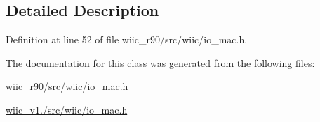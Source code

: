 \subsection{Detailed Description}


Definition at line 52 of file wiic\-\_\-r90/src/wiic/io\-\_\-mac.\-h.



The documentation for this class was generated from the following files\-:\begin{DoxyCompactItemize}
\item 
\hyperlink{wiic__r90_2src_2wiic_2io__mac_8h}{wiic\-\_\-r90/src/wiic/io\-\_\-mac.\-h}\item 
\hyperlink{wiic__v1_81_2src_2wiic_2io__mac_8h}{wiic\-\_\-v1./src/wiic/io\-\_\-mac.\-h}\end{DoxyCompactItemize}
